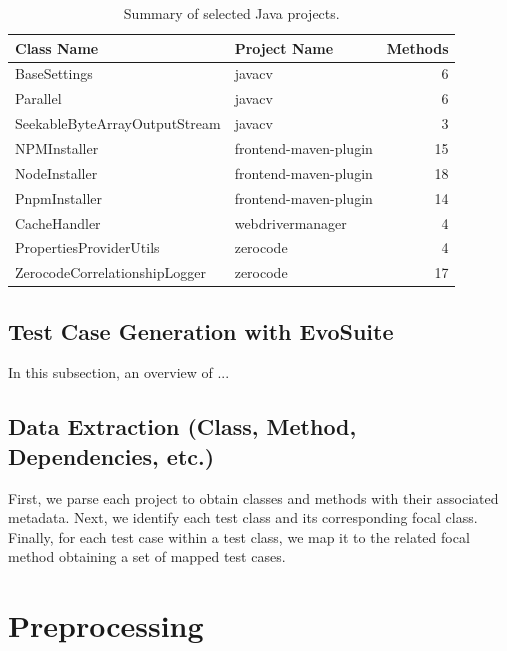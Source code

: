 \begin{table}
    \centering    
    \begin{tabular}{l | l | r}
        \textbf{Class Name} & \textbf{Project Name} & \textbf{Methods} \\
        \hline
        BaseSettings & javacv & 6 \\
        Parallel & javacv & 6 \\
        SeekableByteArrayOutputStream & javacv & 3 \\
        NPMInstaller & frontend-maven-plugin & 15 \\
        NodeInstaller & frontend-maven-plugin & 18 \\
        PnpmInstaller & frontend-maven-plugin & 14 \\
        CacheHandler & webdrivermanager & 4 \\
        PropertiesProviderUtils & zerocode & 4 \\
        ZerocodeCorrelationshipLogger & zerocode & 17 \\
    \end{tabular}
\caption{Summary of selected Java projects.}
\label{tab:selected_java_projects}
\end{table}

\vspace{0.1 cm}
\subsection{Test Case Generation with EvoSuite}
\label{sec:test_case_generation}
\vspace{0.1 cm}

In this subsection, an overview of ...

\vspace{0.1 cm}
\subsection{Data Extraction (Class, Method, Dependencies, etc.)}
\label{sec:data_extraction}
\vspace{0.1 cm}

First, we parse each project to obtain classes and methods with their associated metadata. Next, we identify each test class and its corresponding focal class. Finally, for each test case within a test class, we map it to the related focal method obtaining a set of mapped test cases.


\section{Preprocessing}
\label{sec:preprocessing}
\vspace{0.2 cm}

